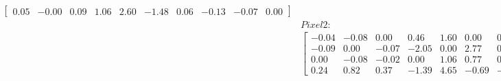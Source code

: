 \begin{subequations}
\begin{align}
\begin{bmatrix}
	      0.05 &      -0.00 &       0.09 &       1.06 &       2.60 &      -1.48 &       0.06 &      -0.13 &      -0.07 &       0.00
	\end{bmatrix}
	\\
	&Pixel 2: \nonumber
	\\
	&\begin{bmatrix}
	     -0.04 &      -0.08 &       0.00 &       0.46 &       1.60 &       0.00 &       0.11 &       0.00 &       0.00 &       0.00 \\
	     -0.09 &       0.00 &      -0.07 &      -2.05 &       0.00 &       2.77 &       0.00 &       0.17 &       0.00 &       0.00 \\
	      0.00 &      -0.08 &      -0.02 &       0.00 &       1.06 &       0.77 &       0.00 &       0.00 &       0.09 &       0.00 \\
	      0.24 &       0.82 &       0.37 &      -1.39 &       4.65 &      -0.69 &      -0.09 &      -0.27 &      -0.90 &      -0.00
	\end{bmatrix}
\end{align}
	\label{eq:nonlinear_dependent}
\end{subequations}
\fi

